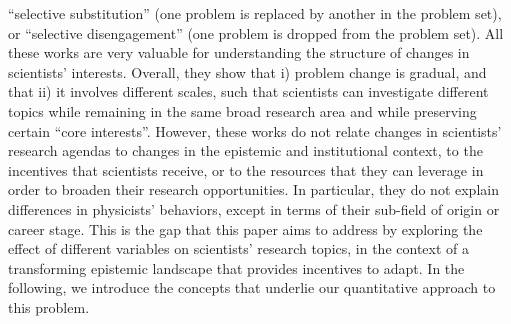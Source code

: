 \documentclass{article}
\begin{document}
``selective substitution'' (one problem is replaced by another in the problem set), or ``selective disengagement'' (one problem is dropped from the problem set). All these works are very valuable for understanding the structure of changes in scientists' interests. Overall, they show that i) problem change is gradual, and that ii) it involves different scales, such that scientists can investigate different topics while remaining in the same broad research area and while preserving certain ``core interests''. However, these works do not relate changes in scientists' research agendas to changes in the epistemic and institutional context, to the incentives that scientists receive, or to the resources that they can leverage in order to broaden their research opportunities. In particular, they do not explain differences in physicists' behaviors, except in terms of their sub-field of origin or career stage. This is the gap that this paper aims to address by exploring the effect of different variables on scientists' research topics, in the context of a transforming epistemic landscape that provides incentives to adapt.  
In the following, we introduce the concepts that underlie our quantitative approach to this problem.
\end{document}
